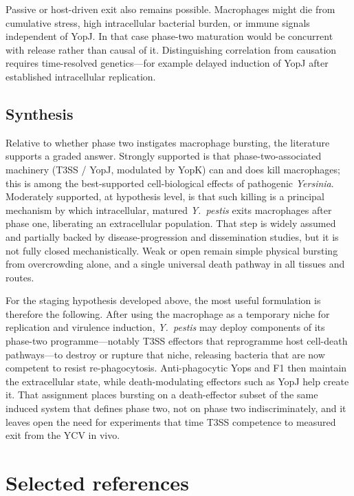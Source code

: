 \documentclass[11pt,a4paper]{article}
\begin{document}
Passive or host-driven exit also remains possible. Macrophages might die from cumulative stress, high intracellular bacterial burden, or immune signals independent of YopJ. In that case phase-two maturation would be concurrent with release rather than causal of it. Distinguishing correlation from causation requires time-resolved genetics---for example delayed induction of YopJ after established intracellular replication.

\subsection{Synthesis}

Relative to whether phase two instigates macrophage bursting, the literature supports a graded answer. Strongly supported is that phase-two-associated machinery (T3SS / YopJ, modulated by YopK) can and does kill macrophages; this is among the best-supported cell-biological effects of pathogenic \textit{Yersinia}. Moderately supported, at hypothesis level, is that such killing is a principal mechanism by which intracellular, matured \textit{Y.\ pestis} exits macrophages after phase one, liberating an extracellular population. That step is widely assumed and partially backed by disease-progression and dissemination studies, but it is not fully closed mechanistically. Weak or open remain simple physical bursting from overcrowding alone, and a single universal death pathway in all tissues and routes.

For the staging hypothesis developed above, the most useful formulation is therefore the following. After using the macrophage as a temporary niche for replication and virulence induction, \textit{Y.\ pestis} may deploy components of its phase-two programme---notably T3SS effectors that reprogramme host cell-death pathways---to destroy or rupture that niche, releasing bacteria that are now competent to resist re-phagocytosis. Anti-phagocytic Yops and F1 then maintain the extracellular state, while death-modulating effectors such as YopJ help create it. That assignment places bursting on a death-effector subset of the same induced system that defines phase two, not on phase two indiscriminately, and it leaves open the need for experiments that time T3SS competence to measured exit from the YCV in vivo.

\section*{Selected references}
\end{document}
